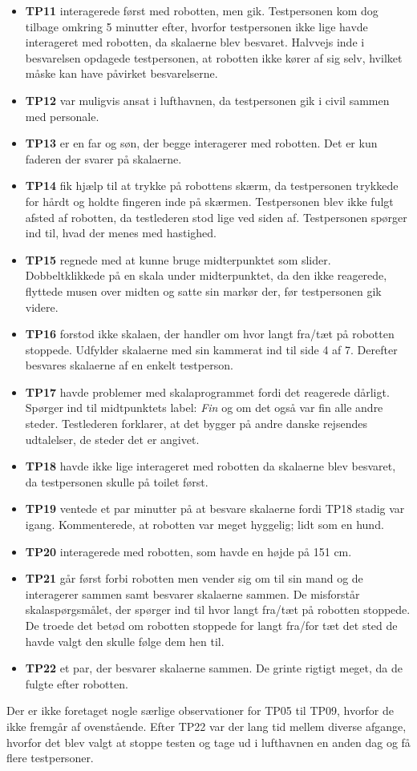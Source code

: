 \begin{itemize}
\item \textbf{TP11} interagerede først med robotten, men gik. Testpersonen kom dog tilbage omkring 5 minutter efter, hvorfor testpersonen ikke lige havde interageret med robotten, da skalaerne blev besvaret. Halvvejs inde i besvarelsen opdagede testpersonen, at robotten ikke kører af sig selv, hvilket måske kan have påvirket besvarelserne.
\item \textbf{TP12} var muligvis ansat i lufthavnen, da testpersonen gik i civil sammen med personale.
\item \textbf{TP13} er en far og søn, der begge interagerer med robotten. Det er kun faderen der svarer på skalaerne.
\item \textbf{TP14} fik hjælp til at trykke på robottens skærm, da testpersonen trykkede for hårdt og holdte fingeren inde på skærmen. Testpersonen blev ikke fulgt afsted af robotten, da testlederen stod lige ved siden af. Testpersonen spørger ind til, hvad der menes med hastighed.
\item \textbf{TP15} regnede med at kunne bruge midterpunktet som slider. Dobbeltklikkede på en skala under midterpunktet, da den ikke reagerede, flyttede musen over midten og satte sin markør der, før testpersonen gik videre.
\item \textbf{TP16} forstod ikke skalaen, der handler om hvor langt fra/tæt på robotten stoppede. Udfylder skalaerne med sin kammerat ind til side 4 af 7. Derefter besvares skalaerne af en enkelt testperson.
\item \textbf{TP17} havde problemer med skalaprogrammet fordi det reagerede dårligt. Spørger ind til midtpunktets label: \textit{Fin} og om det også var fin alle andre steder. Testlederen forklarer, at det bygger på andre danske rejsendes udtalelser, de steder det er angivet.
\item \textbf{TP18} havde ikke lige interageret med robotten da skalaerne blev besvaret, da testpersonen skulle på toilet først.
\item \textbf{TP19} ventede et par minutter på at besvare skalaerne fordi TP18 stadig var igang. Kommenterede, at robotten var meget hyggelig; lidt som en hund.
\item \textbf{TP20} interagerede med robotten, som havde en højde på 151 cm.
\item \textbf{TP21} går først forbi robotten men vender sig om til sin mand og de interagerer sammen samt besvarer skalaerne sammen. De misforstår skalaspørgsmålet, der spørger ind til hvor langt fra/tæt på robotten stoppede. De troede det betød om robotten stoppede for langt fra/for tæt det sted de havde valgt den skulle følge dem hen til.
\item \textbf{TP22} et par, der besvarer skalaerne sammen. De grinte rigtigt meget, da de fulgte efter robotten.\blankline
\end{itemize}
\noindent
%
Der er ikke foretaget nogle særlige observationer for TP05 til TP09, hvorfor de ikke fremgår af ovenstående. Efter TP22 var der lang tid mellem diverse afgange, hvorfor det blev valgt at stoppe testen og tage ud i lufthavnen en anden dag og få flere testpersoner. 

